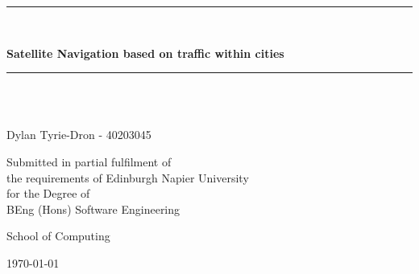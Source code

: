 \newcommand{\HRule}{\rule{\linewidth}{0.5mm}}

\begin{titlepage}
	\begin{center}

	\HRule \\[0.4cm]
    	{\Large \bfseries Satellite Navigation based on traffic within cities\par}
	\vspace{0.2cm}
	\HRule \\[1.5cm]

	
    	\vspace{3cm}
	\begin{minipage}{0.4\textwidth}
	\begin{center} \large
        \emph{}\\
        	Dylan Tyrie-Dron - 40203045
				
   	 \end{center}
    	\end{minipage}
	
	\vspace{2cm}
    	\begin{minipage}{1\textwidth}
    	\begin{center} \large
        
		Submitted in partial fulfilment of \\
		the requirements of Edinburgh Napier University \\
		for the Degree of \\
        	BEng (Hons) Software Engineering
    	\end{center}
    	\end{minipage}

    	\vfill

	\begin{minipage}{1\textwidth}
    	\begin{center} \large
		School of Computing
    	\end{center}
    	\end{minipage}
	
	\vspace{1cm}
    	{\large \today}


	\end{center}
\end{titlepage}

